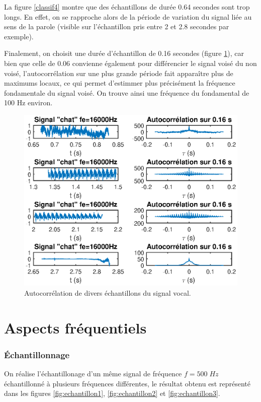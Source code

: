 \documentclass[french]{article}
\begin{document}
La figure \ref{classif4} montre que des échantillons de durée 0.64 secondes sont trop longs. En effet, on se rapproche alors de la période de variation du signal liée au sens de la parole (visible sur l'échantillon pris entre 2 et 2.8 secondes par exemple).


Finalement,  on choisit une durée d'échantillon de 0.16 secondes (figure \ref{classif3}), car bien que celle de 0.06 convienne également pour différencier le signal voisé du non voisé, l'autocorrélation sur une plus grande période fait apparaître plus de maximums locaux, ce qui permet d'estimmer plus précisément la fréquence fondamentale du signal voisé. On trouve ainsi une fréquence du fondamental de 100 Hz environ.

\begin{figure}[h!]
	\centering
	\includegraphics[width=\textwidth]{images/classificationVoix3.eps}
	\caption{Autocorrélation de divers échantillons du signal vocal.}
	\label{classif3}
\end{figure}

\FloatBarrier
\newpage

\part{Aspects fréquentiels}

\section{Échantillonnage}
On réalise l'échantillonage d'un même signal de fréquence $f=500 \; Hz$ échantillonné à plusieurs fréquences différentes, le résultat obtenu est représenté dans les figures \ref{fig:echantillon1}, \ref{fig:echantillon2} et \ref{fig:echantillon3}.
\end{document}
